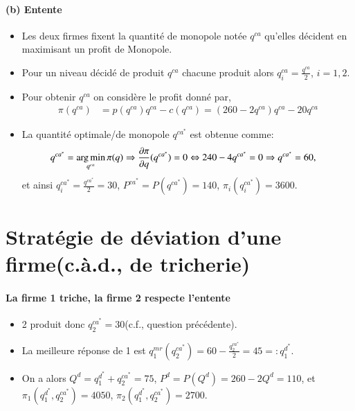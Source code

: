 \begin{frame}[allowframebreaks]{\insertsection}
\framesubtitle{(b) Entente}
    \begin{itemize}
        \item Les deux firmes fixent la quantité de monopole notée $q^{ca}$ qu'elles décident en maximisant un profit de Monopole.
        \item Pour un niveau décidé de produit $q^{ca}$ chacune produit alors $q_i^{ca} = \frac{q^{ca}}{2}$, $i=1, 2$.
        \item Pour obtenir  $q^{ca}$  on considère le profit donné par,
        \begin{align*}
            \pi(q^{ca}) &= p(q^{ca})q^{ca} - c(q^{ca}) = (260-2q^{ca})q^{ca} - 20q^{ca}
        \end{align*}
        \item La quantité optimale/de monopole $q^{ca^*}$ est obtenue comme:
        \begin{align*}
            q^{ca^*} &=\argmin_{q^{ca}}  \pi(q) \Rightarrow \frac{\partial \pi}{\partial q}( q^{ca^*}) = 0 
            \Leftrightarrow 240 -4  q^{ca^*} = 0  \Rightarrow q^{ca^*} = 60,
        \end{align*}
        et ainsi $q_i^{ca^*} =  \frac{q^{ca^*}}{2} = 30$,  $P^{ca^*} = P(q^{ca^*}) = 140$, $\pi_i(q_i^{ca^*}) = 3600$.
    \end{itemize}
\end{frame}    


\section{Stratégie de déviation d'une firme(c.à.d., de tricherie)}
\frame{\sectionpage}
\begin{frame}[allowframebreaks]{\insertsection}
\framesubtitle{La firme 1 triche, la firme 2 respecte l'entente}
    \begin{itemize}
    \item 2 produit donc $q_2^{ca^*} = 30$(c.f., question précédente).  
    \item La meilleure réponse de 1 est $q^{mr}_1(q_2^{ca^*}) = 60 - \frac{q_2^{ca^*}}{2} = 45=: q_1^{d^*}$.
    \item On a alors $Q^{d} = q_1^{d^*} + q_2^{ca^*}  = 75$, $P^d = P(Q^{d}) = 260 - 2 Q^{d} = 110$, et 
    $\pi_1(q_1^{d^*}, q_2^{ca^*} ) = 4050$, $\pi_2(q_1^{d^*}, q_2^{ca^*} ) =2700$.
\end{itemize}
\end{frame}    

